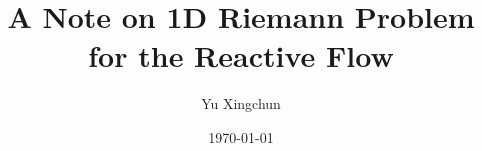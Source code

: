 \documentclass{article}
\begin{document}
\title{A Note on 1D Riemann Problem for the Reactive Flow}

\author{
  Yu Xingchun
}

\date{\today}

\maketitle

\begin{abstract}

\end{abstract}







\end{document}
